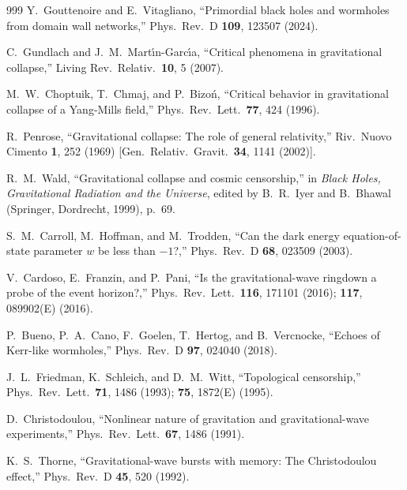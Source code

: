 \documentclass[twocolumn,floatfix,aps,prd,superscriptaddress,nofootinbib]{revtex4-2}
\begin{document}
\begin{thebibliography}{999}
Y.~Gouttenoire and E.~Vitagliano,
\newblock ``Primordial black holes and wormholes from domain wall networks,''
\newblock Phys.\ Rev.\ D \textbf{109}, 123507 (2024).

C.~Gundlach and J.~M.~Mart\'{\i}n-Garc\'{\i}a,
\newblock ``Critical phenomena in gravitational collapse,''
\newblock Living Rev.\ Relativ.\ \textbf{10}, 5 (2007).

M.~W.~Choptuik, T.~Chmaj, and P.~Bizo\'n,
\newblock ``Critical behavior in gravitational collapse of a Yang-Mills field,''
\newblock Phys.\ Rev.\ Lett.\ \textbf{77}, 424 (1996).

R.~Penrose,
\newblock ``Gravitational collapse: The role of general relativity,''
\newblock Riv.\ Nuovo Cimento \textbf{1}, 252 (1969) [Gen.\ Relativ.\ Gravit.\ \textbf{34}, 1141 (2002)].

R.~M.~Wald,
\newblock ``Gravitational collapse and cosmic censorship,''
\newblock in \emph{Black Holes, Gravitational Radiation and the Universe}, edited by B.~R.~Iyer and B.~Bhawal
\newblock (Springer, Dordrecht, 1999), p.~69.

S.~M.~Carroll, M.~Hoffman, and M.~Trodden,
\newblock ``Can the dark energy equation-of-state parameter $w$ be less than $-1$?,''
\newblock Phys.\ Rev.\ D \textbf{68}, 023509 (2003).

V.~Cardoso, E.~Franzin, and P.~Pani,
\newblock ``Is the gravitational-wave ringdown a probe of the event horizon?,''
\newblock Phys.\ Rev.\ Lett.\ \textbf{116}, 171101 (2016); \textbf{117}, 089902(E) (2016).

P.~Bueno, P.~A.~Cano, F.~Goelen, T.~Hertog, and B.~Vercnocke,
\newblock ``Echoes of Kerr-like wormholes,''
\newblock Phys.\ Rev.\ D \textbf{97}, 024040 (2018).

J.~L.~Friedman, K.~Schleich, and D.~M.~Witt,
\newblock ``Topological censorship,''
\newblock Phys.\ Rev.\ Lett.\ \textbf{71}, 1486 (1993); \textbf{75}, 1872(E) (1995).

D.~Christodoulou,
\newblock ``Nonlinear nature of gravitation and gravitational-wave experiments,''
\newblock Phys.\ Rev.\ Lett.\ \textbf{67}, 1486 (1991).

K.~S.~Thorne,
\newblock ``Gravitational-wave bursts with memory: The Christodoulou effect,''
\newblock Phys.\ Rev.\ D \textbf{45}, 520 (1992).


\end{thebibliography}
\end{document}
